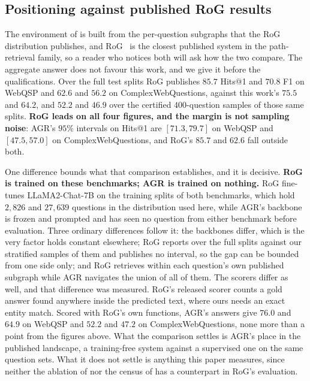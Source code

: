 \subsection{Positioning against published RoG results}\label{sec:rog}

The environment of  is built from the per-question
subgraphs that the RoG distribution publishes, and
RoG~\cite{luo2024reasoning} is the closest published system in the
path-retrieval family, so a reader who notices both will ask how the two
compare. The aggregate answer does not favour this work, and we give it
before the qualifications. Over the full test splits RoG publishes
$85.7$ Hits@1 and $70.8$ F1 on WebQSP and $62.6$ and $56.2$ on
ComplexWebQuestions, against this work's $75.5$ and $64.2$, and $52.2$
and $46.9$ over the certified $400$-question samples of those same
splits. \textbf{RoG leads on all four figures, and the margin is not
sampling noise}: AGR's $95\%$ intervals on Hits@1 are $[71.3, 79.7]$ on
WebQSP and $[47.5, 57.0]$ on ComplexWebQuestions, and RoG's $85.7$ and
$62.6$ fall outside both.

One difference bounds what that comparison establishes, and it is
decisive. \textbf{RoG is trained on these benchmarks; AGR is trained on
nothing.} RoG fine-tunes LLaMA2-Chat-7B on the training splits of both
benchmarks, which hold $2{,}826$ and $27{,}639$ questions in the
distribution used here, while AGR's backbone is frozen and prompted and
has seen no question from either benchmark before evaluation. Three
ordinary differences follow it: the backbones differ, which is the very
factor  holds constant elsewhere; RoG reports over
the full splits against our stratified samples of them and publishes no
interval, so the gap can be bounded from one side only; and RoG
retrieves within each question's own published subgraph while AGR
navigates the union of all of them. The scorers differ as well, and that
difference was measured. RoG's released scorer counts a gold answer
found anywhere inside the predicted text, where ours needs an exact
entity match. Scored with RoG's own functions, AGR's answers give $76.0$
and $64.9$ on WebQSP and $52.2$ and $47.2$ on ComplexWebQuestions, none
more than a point from the figures above. What the comparison settles is
AGR's place in the published landscape, a training-free system against a
supervised one on the same question sets. What it does not settle is
anything this paper measures, since neither the ablation of
 nor the census of  has a
counterpart in RoG's evaluation.

